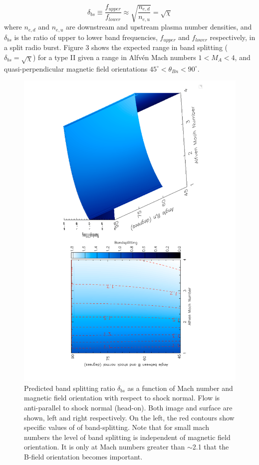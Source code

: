 \begin{equation}
\delta_{bs} \equiv \frac{f_{upper}}{f_{lower}} \approx \sqrt{ \frac{ n_{e,d} }{ n_{e,u} } }=\sqrt{\chi}
\end{equation}
where $n_{e,d}$ and $n_{e,u}$ are downstream and upstream plasma number densities, and $\delta_{bs}$ is the ratio of upper to lower band frequencies, $f_{upper}$ and $f_{lower}$ respectively, in a split radio burst. Figure 3 shows the expected range in band splitting ($\delta_{bs}=\sqrt{\chi}$) for a type II given a range in Alfv\'{e}n Mach numbers $1<M_A< 4$, and quasi-perpendicular magnetic field orientations $45^{\circ}<\theta_{Bn}<90^{\circ}$. 
\begin{figure}[h!]
\includegraphics[scale=0.5, angle=270,trim =  3cm 0cm 4cm 0cm]{images/MHD_vary_mach&thetaBn.pdf}
\caption[Band-splitting as a function of Mach number]{Predicted band splitting ratio $\delta_{bs}$ as a function of Mach number and magnetic field orientation with respect to shock normal. Flow is anti-parallel to shock normal (head-on). Both image and surface are shown, left and right respectively. On the left, the red contours show specific values of of band-splitting. Note that for small mach numbers the level of band splitting is independent of magnetic field orientation. It is only at Mach numbers greater than $\sim$2.1 that the B-field orientation becomes important.}
\label{fig:MHD_vary_mach&thetaBn}
\end{figure}
